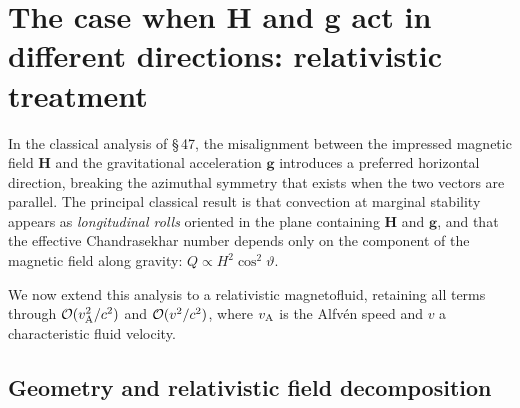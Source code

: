 
\section{The case when \texorpdfstring{$\mathbf{H}$}{H} and
  \texorpdfstring{$\mathbf{g}$}{g} act in different directions:
  relativistic treatment}
\label{sec:rel-47}

In the classical analysis of \S\,47, the misalignment between the
impressed magnetic field $\mathbf{H}$ and the gravitational acceleration
$\mathbf{g}$ introduces a preferred horizontal direction, breaking the
azimuthal symmetry that exists when the two vectors are parallel.  The
principal classical result is that convection at marginal stability
appears as \emph{longitudinal rolls} oriented in the plane containing
$\mathbf{H}$ and $\mathbf{g}$, and that the effective Chandrasekhar
number depends only on the component of the magnetic field along
gravity: $Q \propto H^{2}\cos^{2}\vartheta$.

We now extend this analysis to a relativistic magnetofluid, retaining
all terms through $\mathcal{O}(v_{\mathrm{A}}^{2}/c^{2})$ and $\mathcal{O}(v^{2}/c^{2})$,
where $v_{\mathrm{A}}$ is the Alfv\'en speed and $v$ a characteristic fluid
velocity.

\subsection{Geometry and relativistic field decomposition}
\label{subsec:rel-47-geometry}


